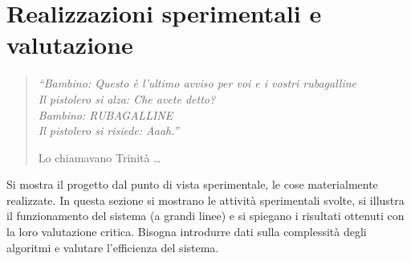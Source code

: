 \chapter{Realizzazioni sperimentali e valutazione}
\label{conclusioni}
\thispagestyle{empty}

\begin{quotation}
{\footnotesize
\noindent\emph{``Bambino: Questo è l'ultimo avviso per voi e i vostri rubagalline \\
Il pistolero si alza: Che avete detto? \\
Bambino: RUBAGALLINE \\
Il pistolero si risiede: Aaah.''}
\begin{flushright}
Lo chiamavano Trinit\`a \dots
\end{flushright}
}
\end{quotation}
\vspace{0.5cm}

\noindent Si mostra il progetto dal punto di vista sperimentale, le cose materialmente realizzate. In questa sezione si mostrano le attivit\`a sperimentali svolte, si illustra il funzionamento del sistema (a grandi linee) e si spiegano i risultati ottenuti con la loro valutazione critica. Bisogna introdurre dati sulla complessit\`a degli algoritmi e valutare l'efficienza del sistema.